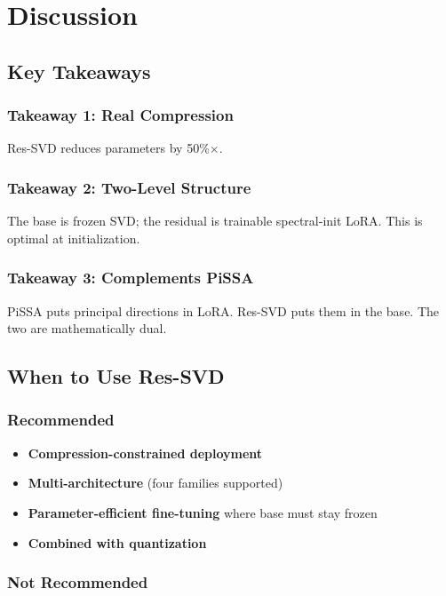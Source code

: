 \section{Discussion}

\subsection{Key Takeaways}

\subsubsection{Takeaway 1: Real Compression}

Res-SVD reduces parameters by 50\%$\times$.

\subsubsection{Takeaway 2: Two-Level Structure}

The base is frozen SVD; the residual is trainable spectral-init LoRA. 
This is optimal at initialization.

\subsubsection{Takeaway 3: Complements PiSSA}

PiSSA puts principal directions in LoRA. Res-SVD puts them in the base. 
The two are mathematically dual.

\subsection{When to Use Res-SVD}

\subsubsection{Recommended}

\begin{itemize}
\item \textbf{Compression-constrained deployment}
\item \textbf{Multi-architecture} (four families supported)
\item \textbf{Parameter-efficient fine-tuning} where base must stay frozen
\item \textbf{Combined with quantization}

\end{itemize}
\subsubsection{Not Recommended}

